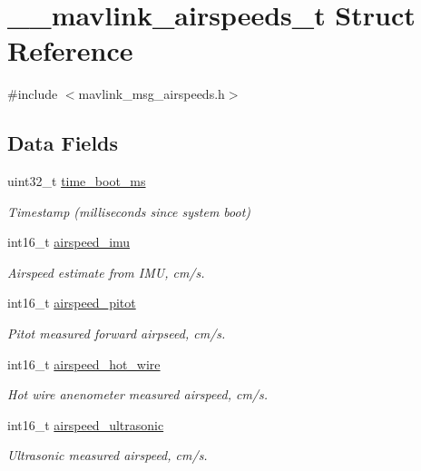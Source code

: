 \hypertarget{struct____mavlink__airspeeds__t}{\section{\+\_\+\+\_\+mavlink\+\_\+airspeeds\+\_\+t Struct Reference}
\label{struct____mavlink__airspeeds__t}
}


{\ttfamily \#include $<$mavlink\+\_\+msg\+\_\+airspeeds.\+h$>$}

\subsection*{Data Fields}
\begin{DoxyCompactItemize}
\item 
uint32\+\_\+t \hyperlink{struct____mavlink__airspeeds__t_a04c766b6cdea91c8918ed3ec8c2e347c}{time\+\_\+boot\+\_\+ms}
\begin{DoxyCompactList}\small\item\em Timestamp (milliseconds since system boot) \end{DoxyCompactList}\item 
int16\+\_\+t \hyperlink{struct____mavlink__airspeeds__t_a295e23b043d0622331000bf0552cf9f7}{airspeed\+\_\+imu}
\begin{DoxyCompactList}\small\item\em Airspeed estimate from I\+M\+U, cm/s. \end{DoxyCompactList}\item 
int16\+\_\+t \hyperlink{struct____mavlink__airspeeds__t_a624eb17f8cc2e74e92940bd8afa01d17}{airspeed\+\_\+pitot}
\begin{DoxyCompactList}\small\item\em Pitot measured forward airpseed, cm/s. \end{DoxyCompactList}\item 
int16\+\_\+t \hyperlink{struct____mavlink__airspeeds__t_aa1875e8945513739f595f4ee7db3babb}{airspeed\+\_\+hot\+\_\+wire}
\begin{DoxyCompactList}\small\item\em Hot wire anenometer measured airspeed, cm/s. \end{DoxyCompactList}\item 
int16\+\_\+t \hyperlink{struct____mavlink__airspeeds__t_a6b4adda62acb39bfa6aed555ad5038c3}{airspeed\+\_\+ultrasonic}
\begin{DoxyCompactList}\small\item\em Ultrasonic measured airspeed, cm/s. \end{DoxyCompactList}\item 

\end{DoxyCompactItemize}
